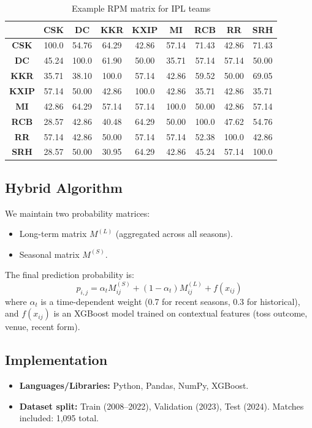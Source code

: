 \documentclass{article}
\begin{document}
\begin{table}[h]
\centering
\caption{Example RPM matrix for IPL teams}
\label{tab:rpm_example}
\begin{tabular}{c|cccccccc}
\toprule
\textbf{} & \textbf{CSK} & \textbf{DC} & \textbf{KKR} & \textbf{KXIP} & \textbf{MI} & \textbf{RCB} & \textbf{RR} & \textbf{SRH} \\
\midrule
\textbf{CSK} & 100.0 & 54.76 & 64.29 & 42.86 & 57.14 & 71.43 & 42.86 & 71.43 \\
\textbf{DC} & 45.24 & 100.0 & 61.90 & 50.00 & 35.71 & 57.14 & 57.14 & 50.00 \\
\textbf{KKR} & 35.71 & 38.10 & 100.0 & 57.14 & 42.86 & 59.52 & 50.00 & 69.05 \\
\textbf{KXIP} & 57.14 & 50.00 & 42.86 & 100.0 & 42.86 & 35.71 & 42.86 & 35.71 \\
\textbf{MI} & 42.86 & 64.29 & 57.14 & 57.14 & 100.0 & 50.00 & 42.86 & 57.14 \\
\textbf{RCB} & 28.57 & 42.86 & 40.48 & 64.29 & 50.00 & 100.0 & 47.62 & 54.76 \\
\textbf{RR} & 57.14 & 42.86 & 50.00 & 57.14 & 57.14 & 52.38 & 100.0 & 42.86 \\
\textbf{SRH} & 28.57 & 50.00 & 30.95 & 64.29 & 42.86 & 45.24 & 57.14 & 100.0 \\
\bottomrule
\end{tabular}
\end{table}

\subsection{Hybrid Algorithm}
We maintain two probability matrices:
\begin{itemize}
    \item Long-term matrix $M^{(L)}$ (aggregated across all seasons).
    \item Seasonal matrix $M^{(S)}$.
\end{itemize}
The final prediction probability is:
$$\hat{p}_{i,j}=\alpha_{t}M_{ij}^{(S)}+(1-\alpha_{t})M_{ij}^{(L)}+f(x_{ij})$$
where $\alpha_{t}$ is a time-dependent weight (0.7 for recent seasons, 0.3 for historical), and $f(x_{ij})$ is an XGBoost model trained on contextual features (toss outcome, venue, recent form).

\subsection{Implementation}
\begin{itemize}
    \item \textbf{Languages/Libraries:} Python, Pandas, NumPy, XGBoost.
    \item \textbf{Dataset split:} Train (2008--2022), Validation (2023), Test (2024). Matches included: 1,095 total.
\end{itemize}
\end{document}
